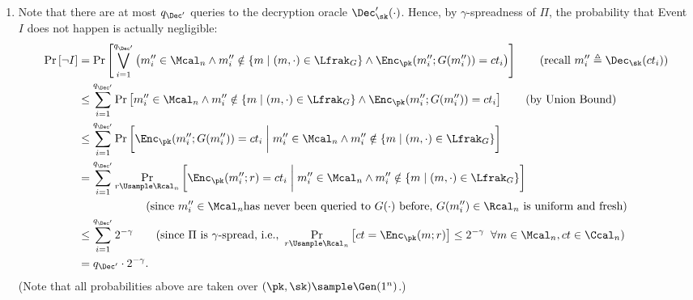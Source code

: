 \begin{answer}[i]
\begin{enumerate}
        \item Note that there are at most $q_{\Dec'}$ queries to the decryption oracle $\Dec'_\sk(\cdot)$. Hence, by $\gamma$-spreadness of $\Pi$, the probability that Event $I$ does not happen is actually negligible:
        \begin{align}\label{eq:p2-1-2}
            \Pr\left[\neg I \right]
            &= \Pr\left[\bigvee_{i=1}^{q_{\Dec'}} \left( m''_i\in\Mcal_n \land m''_i\notin \{m\mid (m,\cdot)\in \Lfrak_G\} \land \Enc_\pk(m''_i; G(m''_i))=ct_i \right) \right]
            \qquad (\textrm{recall } m''_i\triangleq \Dec_\sk(ct_i))\notag\\
            &\le \sum_{i=1}^{q_{\Dec'}} \Pr\left[ m''_i\in\Mcal_n \land m''_i\notin \{m\mid (m,\cdot)\in \Lfrak_G\} \land \Enc_\pk(m''_i; G(m''_i))=ct_i \right]
            \qquad (\textrm{by Union Bound})\notag\\
            &\le \sum_{i=1}^{q_{\Dec'}} \Pr\left[ \Enc_\pk(m''_i; G(m''_i))=ct_i \biggm\vert m''_i\in\Mcal_n \land m''_i\notin \{m\mid (m,\cdot)\in \Lfrak_G\} \right]\notag\\
            &= \sum_{i=1}^{q_{\Dec'}} \Pr_{r\Usample\Rcal_n}\left[  \Enc_\pk(m''_i; r)=ct_i  \biggm\vert m''_i\in\Mcal_n \land m''_i\notin \{m\mid (m,\cdot)\in \Lfrak_G\} \right]\notag\\
            &\qquad\qquad\qquad (\textrm{since } m''_i\in\Mcal_n \textrm{has never been queried to } G(\cdot) \textrm{ before, } G(m''_i)\in\Rcal_n \textrm{ is uniform and fresh})\notag\\
            &\le \sum_{i=1}^{q_{\Dec'}} 2^{-\gamma}
            \qquad (\textrm{since } \Pi \textrm{ is } \gamma\textrm{-spread, i.e., } \Pr_{r\Usample\Rcal_n}\left[ct=\Enc_\pk(m; r)\right] \le 2^{-\gamma}\;\; \forall m\in\Mcal_n, ct\in\Ccal_n)\notag\\
            &= q_{\Dec'} \cdot 2^{-\gamma}.
        \end{align}
        (Note that all probabilities above are taken over $(\pk, \sk)\sample\Gen(1^n)$.)
        

\end{enumerate}
\end{answer}
